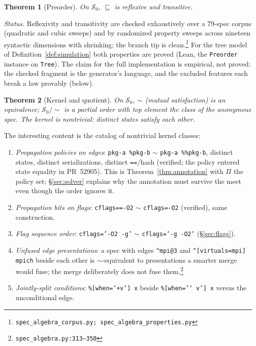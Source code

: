 \documentclass[11pt]{article}
\newtheorem{theorem}{Theorem}[section]
\theoremstyle{definition}
\theoremstyle{remark}
\newcommand{\sat}{\sqsubseteq}
\renewcommand{\ker}{\sim}
\newcommand{\Spec}{\mathcal{S}}
\newcommand{\code}[1]{\texttt{#1}}
\newcommand{\src}[1]{\footnote{\code{#1}}}
\begin{document}
\begin{theorem}[Preorder]\label{thm:preorder}
On $\Spec_0$, $\sat$ is reflexive and transitive.
\end{theorem}

\emph{Status.}  Reflexivity and transitivity are checked exhaustively over a
79-spec corpus (quadratic and cubic sweeps) and by randomized property
sweeps across nineteen syntactic dimensions with shrinking; the branch tip is
clean.\src{spec\_algebra\_corpus.py; spec\_algebra\_properties.py}  For the
tree model of Definition~\ref{def:simulation} both properties are proved
(Lean, the \code{Preorder} instance on \code{Tree}).  The claim for the full implementation is empirical,
not proved: the checked fragment is the generator's language, and the
excluded features each break a law provably (below).

\begin{theorem}[Kernel and quotient]\label{thm:kernel}
On $\Spec_0$, $\ker$ (mutual satisfaction) is an equivalence;
$\Spec_0/\!\ker$ is a partial order with top element the class of the
anonymous spec.  The kernel is nontrivial: distinct states satisfy each other.
\end{theorem}

The interesting content is the catalog of nontrivial kernel classes:

\begin{enumerate}[itemsep=2pt]
\item \emph{Propagation policies on edges}: \code{pkg-a \%pkg-b} $\ker$
      \code{pkg-a \%\%pkg-b}, distinct states, distinct serializations,
      distinct \code{==}/hash (verified; the policy entered state equality in
      PR~52905).  This is Theorem~\ref{thm:annotation} with $\Pi$ the policy
      set; \S\ref{sec:solver} explains why the annotation must survive the
      meet even though the order ignores it.
\item \emph{Propagation bits on flags}: \code{cflags==-O2} $\ker$
      \code{cflags=-O2} (verified), same construction.
\item \emph{Flag sequence order}: \code{cflags='-O2 -g'} $\ker$
      \code{cflags='-g -O2'} (\S\ref{sec:flags}).
\item \emph{Unfused edge presentations}: a spec with edges
      \code{\^{}mpi@3} and \code{\^{}[virtuals=mpi] mpich} beside each other
      is $\ker$-equivalent to presentations a smarter merge would fuse; the
      merge deliberately does not fuse them.\src{spec\_algebra.py:313--350}
\item \emph{Jointly-split conditions}: \code{\%[when='+v'] x} beside
      \code{\%[when='\char`~v'] x} versus the unconditional edge.
\end{enumerate}
\end{document}
